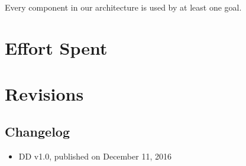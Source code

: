 \documentclass[english]{article}
\begin{document}
Every component in our architecture is used by at least one goal.

\newpage

\section{Effort Spent}

\section{Revisions}

\subsection{Changelog}
\begin{itemize}
	\item{DD v1.0, published on December 11, 2016}
\end{itemize}
\end{document}
